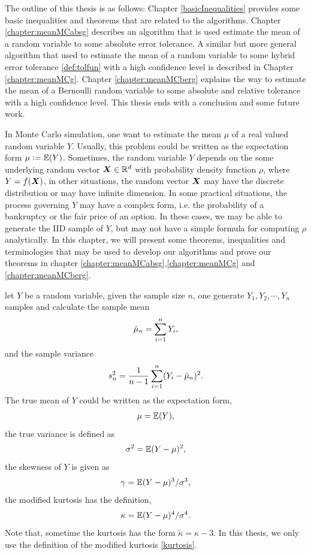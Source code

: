\documentclass{iitthesis}
\begin{document}
The outline of this thesis is as follows: Chapter \ref{basicInequalities} provides some basic inequalities and theorems that are related to the algorithms. Chapter \ref{chapter:meanMCabsg} describes an algorithm that is used estimate the mean of a random variable to some absolute error tolerance. A similar but more general algorithm that used to estimate the mean of a random variable to some hybrid error tolerance \ref{def:tolfun} with a high confidence level is described in Chapter \ref{chapter:meanMCg}. Chapter \ref{chapter:meanMCberg} explains the way to estimate the mean of a Bernoulli random variable to some absolute and relative tolerance with a high confidence level. This thesis ends with a conclusion and some future work.

\label{basicInequalities}
In Monte Carlo simulation, one want to estimate the mean $\mu$ of a real valued random variable $Y$. Usually, this problem could be written as the expectation form $\mu:=\mathbb{E}(Y)$. Sometimes, the random variable $Y$ depends on the some underlying random vector $\boldsymbol{X} \in \mathbb{R}^d$ with probability density function $\rho$, where $Y = f(\boldsymbol{X})$, in other situations, the random vector $\boldsymbol{X}$ may have the discrete distribution or may have infinite dimension. In some practical situations, the process governing $Y$ may have a complex form, i.e. the probability of a bankruptcy or the fair price of an option. In these cases, we may be able to generate the IID sample of $Y$, but may not have a simple formula for computing $\rho$ analytically. 
In this chapter, we will present some theorems, inequalities and terminologies that may be used to develop our algorithms and prove our theorems in chapter \ref{chapter:meanMCabsg},\ref{chapter:meanMCg} and \ref{chapter:meanMCberg}.

let $Y$ be a random variable, given the sample size $n$, one generate $Y_1, Y_2, \cdots, Y_n$ samples and calculate the sample mean 
\begin{align}\label{samplemean}
\hat{\mu}_n = \sum_{i=1}^n Y_i,
\end{align}
and the sample variance
\begin{align}\label{samplevar}
s^2_n = \frac{1}{n-1}\sum_{i=1}^n (Y_i-\hat{\mu}_n)^2.
\end{align}
The true mean of $Y$ could be written as the expectation form,
\begin{align}\label{truemean}
\mu = \mathbb{E}(Y),
\end{align}
the true variance is defined as
\begin{align}\label{truevar}
\sigma^2 = \mathbb{E}(Y-\mu)^2,
\end{align}
the skewness of $Y$ is given as 
\begin{align}\label{screwness}
\gamma = \mathbb{E}(Y-\mu)^3/\sigma^3,
\end{align}
the modified kurtosis has the definition,
\begin{align}\label{kurtosis}
\kappa = \mathbb{E}(Y-\mu)^4/\sigma^4.
\end{align}
Note that, sometime the kurtosis has the form $\tilde{\kappa} = \kappa-3$. In this thesis, we only use the definition of the modified kurtosis \eqref{kurtosis}.
\end{document}
